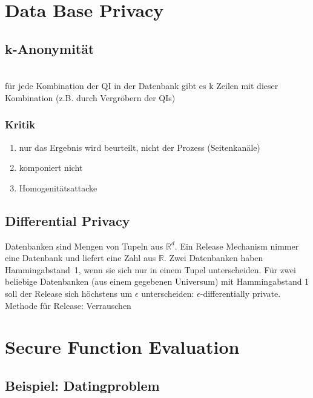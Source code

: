 \documentclass[a4paper,twoside,DIV15,BCOR12mm]{scrbook}
\begin{document}

\chapter{Data Base Privacy}

\section{k-Anonymität}

\\

für jede Kombination der QI in der Datenbank gibt es k Zeilen mit dieser Kombination (z.B. durch Vergröbern der QIs)

\subsection{Kritik}

\begin{enumerate}
	\item nur das Ergebnis wird beurteilt, nicht der Prozess (Seitenkanäle)
	\item komponiert nicht
	\item Homogenitätsattacke
\end{enumerate}

\section{Differential Privacy}

Datenbanken sind Mengen von Tupeln aus $\mathbb{R}^d$. Ein Release Mechanism nimmer eine Datenbank und liefert eine Zahl aus $\mathbb{R}$. Zwei Datenbanken haben \glqq Hammingabstand\grqq\ 1, wenn sie sich nur in einem Tupel unterscheiden. Für zwei beliebige Datenbanken (aus einem gegebenen Universum) mit Hammingabstand 1 soll der Release sich höchstens um $\epsilon$ unterscheiden: \glqq $\epsilon$-differentially private\grqq.\\

Methode für Release: Verrauschen


\chapter{Secure Function Evaluation}

\section{Beispiel: Datingproblem}
\end{document}
